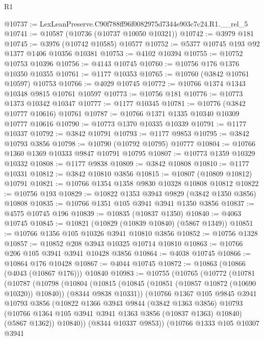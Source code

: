 \begin{lexlean}{R1}
\begin{coremodule}
@10737 := LexLeanPreserve.C90f788ff96f0082975d7344e903c7c24.R1.__rel_5
@10741 := @10587 (@10736 (@10737 @10050 @10321))
@10742 := @3979 @181
@10745 := @3976 (@10742 @10585) @10577
@10752 := @5377 @10745 @193 @92 @1377 @1406 @10356 @10381
@10753 := @4102 @10394
@10755 := @10752 @10753 @10396
@10756 := @4143 @10745
@10760 := @10756 @176 @1376 @10350 @10355
@10761 := @1177 @10353
@10765 := @10760 (@3842 @10761 @10597) @10753
@10766 := @4029 @10745
@10772 := @10766 @1374 @1343 @10348 @9815 @10761 @10597
@10773 := @10756 @181
@10776 := @10773 @1373 @10342 @10347
@10777 := @1177 @10345
@10781 := @10776 (@3842 @10777 @10616) @10761
@10787 := @10766 @1371 @1335 @10340 @10309 @10777 @10616
@10790 := @10773 @1370 @10335 @10339
@10791 := @1177 @10337
@10792 := @3842 @10791
@10793 := @1177 @9853
@10795 := @3842 @10793 @3856
@10798 := @10790 (@10792 @10795) @10777
@10804 := @10766 @1360 @1369 @10333 @9847 @10791 @10795
@10807 := @10773 @1359 @10329 @10332
@10808 := @1177 @9838
@10809 := @3842 @10808
@10810 := @1177 @10331
@10812 := @3842 @10810 @3856
@10815 := @10807 (@10809 @10812) @10791
@10821 := @10766 @1354 @1358 @9830 @10328 @10808 @10812
@10822 := @10756 @193
@10829 := @10822 @1353 @3943 @9829 (@3842 @1350 @3856) @10808
@10835 := @10766 @1351 @105 @3941 @3941 @1350 @3856
@10837 := @4575 @10745 @196
@10839 := @10835 (@10837 @1350)
@10840 := @4063 @10745
@10845 := @10821 (@10829 (@10839 @10840) (@5867 @1349))
@10851 := @10766 @1356 @105 @10326 @3941 @10810 @3856
@10852 := @10756 @1328
@10857 := @10852 @208 @3943 @10325 @10714 @10810
@10863 := @10766 @206 @105 @3941 @3941 @10428 @3856
@10864 := @4038 @10745
@10866 := @10864 @176 @10428
@10867 := @4044 @10745
@10872 := @10863 (@10866 (@4043 (@10867 @176))) @10840
@10983 := @10755
    (@10765
      (@10772
        (@10781
          (@10787
            (@10798
              (@10804
                (@10815
                  (@10845 (@10851 (@10857 @10872 (@10690 @10320)) @10840))
                  (@8344 @9838 @10331))
                (@10766
                  @1367
                  @105
                  @9845
                  @3941
                  @10793
                  @3856
                  (@10822
                    @1366
                    @3943
                    @9844
                    (@3842 @1363 @3856)
                    @10793
                    (@10766 @1364 @105 @3941 @3941 @1363 @3856 (@10837 @1363) @10840)
                    (@5867 @1362))
                  @10840))
              (@8344 @10337 @9853))
            (@10766
              @1333
              @105
              @10307
              @3941

\end{coremodule}
\end{lexlean}
